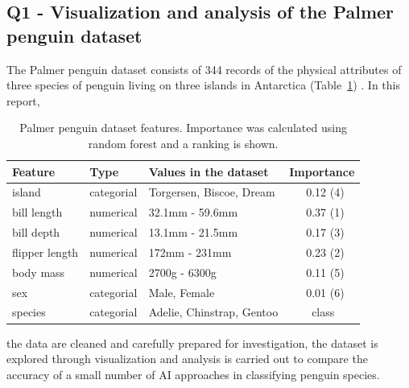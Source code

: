 \documentclass[a4paper, 11pt]{article}
\begin{document}
\begin{center}
  \subsection*{Q1 - Visualization and analysis of the Palmer penguin dataset}
\end{center}

\noindent
The Palmer penguin dataset consists of 344 records of the physical attributes of three species of penguin 
living on three islands in Antarctica (Table~\ref{tab:dataset}) \cite{PM}. In this
report, 
\begin{table} %
  \small
  \begin{center}
  \vspace{-1.5\baselineskip} %
  \setlength{\abovecaptionskip}{5pt}
  \setlength{\belowcaptionskip}{5pt}
  \fontsize{10}{10}\selectfont %
  \begin{tabular}{l|l|l|l}
  \textbf{Feature}&\textbf{Type}&\textbf{Values in the dataset}&\textbf{Importance}\\
  \hline
  island&categorial&Torgersen, Biscoe, Dream&\ \ \ 0.12 (4)\\
  bill length&numerical&32.1mm - 59.6mm&\ \ \ 0.37 (1)\\
  bill depth&numerical&13.1mm - 21.5mm&\ \ \ 0.17 (3)\\
  flipper length&numerical&172mm - 231mm&\ \ \ 0.23 (2)\\
  body mass&numerical&2700g - 6300g&\ \ \ 0.11 (5)\\
  sex&categorial&Male, Female&\ \ \ 0.01 (6)\\
  species&categorial&Adelie, Chinstrap, Gentoo&\ \ \ \ class\\
  \end{tabular}
  \vspace{-2\baselineskip} %
  \end{center} 
  \caption{\centering\linespread{0.8}\selectfont Palmer penguin dataset features. Importance was calculated using random forest and a ranking is shown.}
  \vspace{-1\baselineskip} %
  \label{tab:dataset}
\end{table}
the data are cleaned and carefully prepared for investigation, 
the dataset is explored through visualization and analysis is carried out 
to compare the accuracy of a small number of AI approaches in classifying penguin species.
\end{document}
